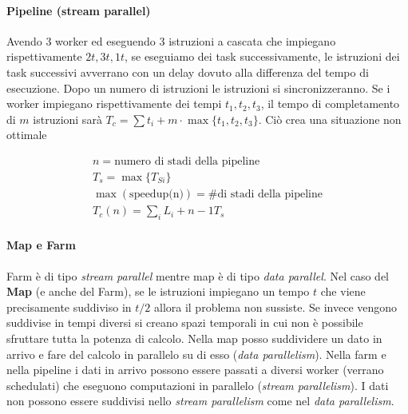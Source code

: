 

\paragraph{Pipeline (stream parallel)}


Avendo 3 worker ed eseguendo 3 istruzioni a cascata che impiegano rispettivamente $ 2t, 3t, 1t $, se eseguiamo dei task successivamente, le istruzioni dei task successivi avverrano con un delay dovuto alla differenza del tempo di esecuzione. Dopo un numero di istruzioni le istruzioni si sincronizzeranno. Se i worker impiegano rispettivamente dei tempi $ t_1,t_2,t_3 $, il tempo di completamento di $ m $ istruzioni sarà $ T_c = \sum t_i + m \cdot \max\{t_1,t_2,t_3\} $. Ciò crea una situazione non ottimale

\[ \begin{aligned}
n = \text{numero di stadi della pipeline} \\
T_s = \max\{T_{Si}\} \\
\max(\text{speedup(n)}) = \text{\# di stadi della pipeline} \\
T_c (n) = \sum_i L_i + n-1 T_s
\end{aligned} \]


\paragraph{Map e Farm}

Farm è di tipo \textit{stream parallel} mentre map è di tipo \textit{data parallel}. Nel caso del \textbf{Map} (e anche del Farm), se le  istruzioni impiegano un tempo $ t $ che viene precisamente suddiviso in $ t/2 $ allora il problema non sussiste. Se invece vengono suddivise in tempi diversi si creano spazi temporali in cui non è possibile sfruttare tutta la potenza di calcolo. Nella map posso suddividere un dato in arrivo e fare del calcolo in parallelo su di esso (\textit{data parallelism}). Nella farm e nella pipeline i dati in arrivo possono essere passati a diversi worker (verrano schedulati) che eseguono computazioni in parallelo (\textit{stream parallelism}). I dati non possono essere suddivisi nello \textit{stream parallelism} come nel \textit{data parallelism}.

